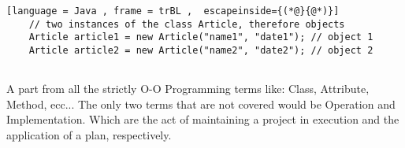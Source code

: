 \begin{parlist}
\begin{lstlisting}[language = Java , frame = trBL ,  escapeinside={(*@}{@*)}]
	// two instances of the class Article, therefore objects
	Article article1 = new Article("name1", "date1"); // object 1
	Article article2 = new Article("name2", "date2"); // object 2
	
	\end{lstlisting}
	\item A part from all the strictly O-O Programming terms like: Class, Attribute, Method, ecc... The only two terms that are not covered would be Operation and Implementation. Which are the act of maintaining a project in execution and the application of a plan, respectively.

\end{parlist}

